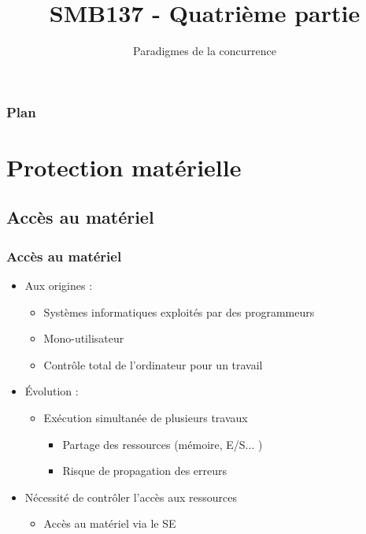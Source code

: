 

\title{SMB137 - Quatrième partie}
\subtitle{Paradigmes de la concurrence}


\frame[plain]{\titlepage}

\begin{frame}
 \frametitle{Plan}
 \tableofcontents
\end{frame} 

\section{Protection matérielle}

\subsection{Accès au matériel}

\begin{frame}
\frametitle{Accès au matériel}
\begin{itemize}
\item Aux origines :
\begin{itemize}
\item Systèmes informatiques exploités par des programmeurs
\item Mono-utilisateur
\item Contrôle total de l’ordinateur pour un travail
\end{itemize}
\item Évolution :
\begin{itemize}
\item Exécution simultanée de plusieurs travaux
\begin{itemize}
\item Partage des ressources (mémoire, E/S... )
\item Risque de propagation des erreurs
\end{itemize}
\end{itemize}
\item Nécessité de contrôler l'accès aux ressources
\begin{itemize}
\item Accès au matériel via le SE
\end{itemize}
\end{itemize}
\end{frame}


